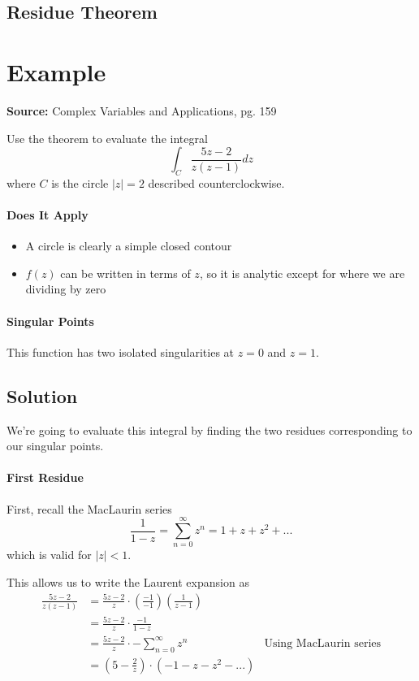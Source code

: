 \documentclass[]{article}
\begin{document}
\subsection{Residue Theorem}

\section{Example}
\textbf{Source:} Complex Variables and Applications, pg. 159

Use the theorem to evaluate the integral
\[\int_C \frac{5z - 2}{z(z-1)} dz \]
where $C$ is the circle $|z| = 2$ described counterclockwise.

\paragraph{Does It Apply}
\begin{itemize}
	\item A circle is clearly a simple closed contour
	\item $f(z)$ can be written in terms of $z$, so it is analytic except for where we are dividing by zero
\end{itemize}

\paragraph{Singular Points}
This function has two isolated singularities at $z = 0$ and $z = 1$.

\subsection{Solution}
We're going to evaluate this integral by finding the two residues corresponding to our singular points.

\paragraph{First Residue}
First, recall the MacLaurin series
\[\frac{1}{1-z} = \sum^{\infty}_{n=0} z^n = 1 + z + z^2 + ...\]
which is valid for $|z| < 1$.

This allows us to write the Laurent expansion as
\[\begin{aligned}
\frac{5z - 2}{z(z-1)}
&= \frac{5z - 2}{z} \cdot (\frac{-1}{-1})(\frac{1}{z-1}) \\
&= \frac{5z - 2}{z} \cdot \frac{-1}{1 - z} \\
&= \frac{5z - 2}{z} \cdot -\sum^{\infty}_{n=0} z^n & \text{Using MacLaurin series} \\
&= (5 - \frac{2}{z}) \cdot (-1 - z - z^2 - ...)
\end{aligned}\]
\end{document}
